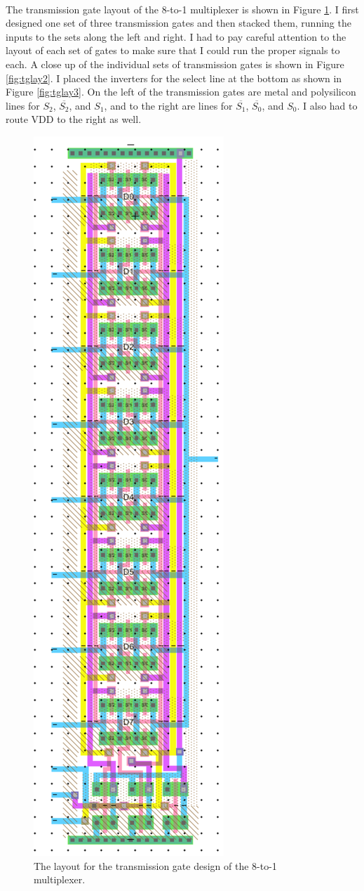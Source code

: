 \documentclass{article}
\begin{document}
    \paragraph{}
    The transmission gate layout of the 8-to-1 multiplexer is shown in Figure \ref{fig:tglay1}. I first designed one set of three transmission gates and then stacked them, running the inputs to the sets along the left and right. I had to pay careful attention to the layout of each set of gates to make sure that I could run the proper signals to each. A close up of the individual sets of transmission gates is shown in Figure \ref{fig:tglay2}. I placed the inverters for the select line at the bottom as shown in Figure \ref{fig:tglay3}. On the left of the transmission gates are metal and polysilicon lines for $S_2$, $\overline{S_2}$, and $S_1$, and to the right are lines for $\overline{S_1}$, $\overline{S_0}$, and $S_0$. I also had to route VDD to the right as well.


    \begin{figure}[H]
      \centering
      \includegraphics[width=0.4\linewidth, frame]{screenshots/tg/lay/lay1.png}
      \caption{The layout for the transmission gate design of the 8-to-1 multiplexer.}
      \label{fig:tglay1}
    \end{figure}
\end{document}
